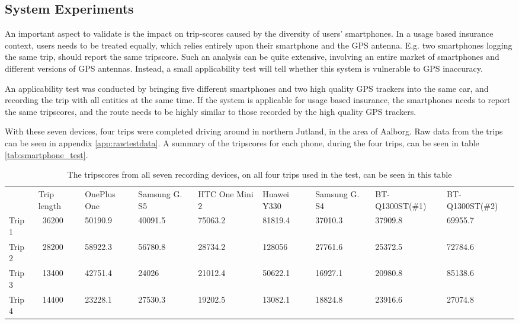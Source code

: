 \subsection{System Experiments}\label{subsec:expsystem}
An important aspect to validate is the impact on trip-scores caused by the diversity of users' smartphones. In a usage based insurance context, users needs to be treated equally, which relies entirely upon their smartphone and the GPS antenna. E.g. two smartphones logging the same trip, should report the same tripscore. Such an analysis can be quite extensive, involving an entire market of smartphones and different versions of GPS antennas. Instead, a small applicability test will tell whether this system is vulnerable to GPS inaccuracy. 

An applicability test was conducted by bringing five different smartphones and two high quality GPS trackers into the same car, and recording the trip with all entities at the same time. If the system is applicable for usage based insurance, the smartphones needs to report the same tripscores, and the route needs to be highly similar to those recorded by the high quality GPS trackers. 

With these seven devices, four trips were completed driving around in northern Jutland, in the area of Aalborg. Raw data from the trips can be seen in appendix \ref{app:rawtestdata}. A summary of the tripscores for each phone, during the four trips, can be seen in table \ref{tab:smartphone_test}.

\begin{table*}[tb]
\centering
\caption{The tripscores from all seven recording devices, on all four trips used in the test, can be seen in this table}
\label{tab:smartphone_test_one}
\begin{tabular}{lllllllll}
       & Trip length & OnePlus One & Samsung G. S5 & HTC One Mini 2 & Huawei Y330 & Samsung G. S4 & BT-Q1300ST(\#1) & BT-Q1300ST(\#2) \\
Trip 1 & ~36200 & 50190.9     & 40091.5       & 75063.2        & 81819.4 & 37010.3       & 37909.8         & 69955.7         \\
Trip 2 & ~28200 & 58922.3     & 56780.8       & 28734.2        & 128056  & 27761.6       & 25372.5         & 72784.6         \\
Trip 3 & ~13400 & 42751.4     & 24026         & 21012.4        & 50622.1 & 16927.1       & 20980.8         & 85138.6         \\
Trip 4 & ~14400 & 23228.1     & 27530.3       & 19202.5        & 13082.1 & 18824.8       & 23916.6         & 27074.8        
\end{tabular}
\end{table*}

